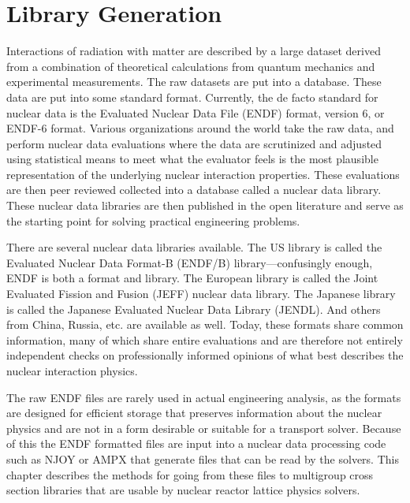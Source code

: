 \chapter{Library Generation} \label{Sec:libraryGeneration}

Interactions of radiation with matter are described by a large dataset derived from a combination of theoretical calculations from quantum mechanics and experimental measurements. The raw datasets are put into a database. These data are put into some standard format. Currently, the de facto standard for nuclear data is the Evaluated Nuclear Data File (ENDF) format, version 6, or ENDF-6 format. Various organizations around the world take the raw data, and perform nuclear data evaluations where the data are scrutinized and adjusted using statistical means to meet what the evaluator feels is the most plausible representation of the underlying nuclear interaction properties. These evaluations are then peer reviewed collected into a database called a nuclear data library. These nuclear data libraries are then published in the open literature and serve as the starting point for solving practical engineering problems.

There are several nuclear data libraries available. The US library is called the Evaluated Nuclear Data Format-B (ENDF/B) library---confusingly enough, ENDF is both a format and library. The European library is called the Joint Evaluated Fission and Fusion (JEFF) nuclear data library. The Japanese library is called the Japanese Evaluated Nuclear Data Library (JENDL). And others from China, Russia, etc. are available as well. Today, these formats share common information, many of which share entire evaluations and are therefore not entirely independent checks on professionally informed opinions of what best describes the nuclear interaction physics.

The raw ENDF files are rarely used in actual engineering analysis, as the formats are designed for efficient storage that preserves information about the nuclear physics and are not in a form desirable or suitable for a transport solver. Because of this the ENDF formatted files are input into a nuclear data processing code such as NJOY or AMPX that generate files that can be read by the solvers. This chapter describes the methods for going from these files to multigroup cross section libraries that are usable by nuclear reactor lattice physics solvers.




